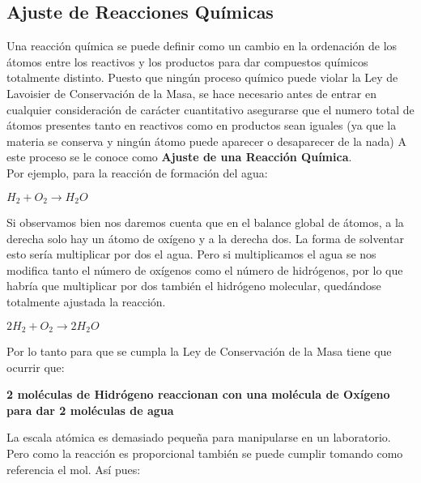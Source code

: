 \subsection{Ajuste de Reacciones Químicas}

Una reacción química se puede definir como un cambio en la ordenación de los átomos entre los reactivos y los productos para dar compuestos químicos totalmente distinto. Puesto que ningún proceso químico puede violar la Ley de Lavoisier de Conservación de la Masa, se hace necesario antes de entrar en cualquier consideración de carácter cuantitativo asegurarse que el numero total de átomos presentes tanto en reactivos como en productos sean iguales (ya que la materia se conserva y ningún átomo puede aparecer o desaparecer de la nada) A este proceso se le conoce como \textbf{Ajuste de una Reacción Química}.\\

Por ejemplo, para la reacción de formación del agua:\\

\begin{center}
	$H_2 + O_2 \longrightarrow H_2O$
\end{center}

Si observamos bien nos daremos cuenta que en el balance global de átomos, a la derecha solo hay un átomo de oxígeno y a la derecha dos. La forma de solventar esto sería multiplicar por dos el agua. Pero si multiplicamos el agua se nos modifica tanto el número de oxígenos como el número de hidrógenos, por lo que habría que multiplicar por dos también el hidrógeno molecular, quedándose totalmente ajustada la reacción.\\

\begin{center}
	$2H_2 + O_2 \longrightarrow 2H_2O$
\end{center}

Por lo tanto para que se cumpla la Ley de Conservación de la Masa tiene que ocurrir que:\\

\begin{center}
\textbf{2 moléculas de Hidrógeno reaccionan con una molécula de Oxígeno para dar 2 moléculas de agua}
\end{center}

La escala atómica es demasiado pequeña para manipularse en un laboratorio. Pero como la reacción es proporcional también se puede cumplir tomando como referencia el mol. Así pues:\\

